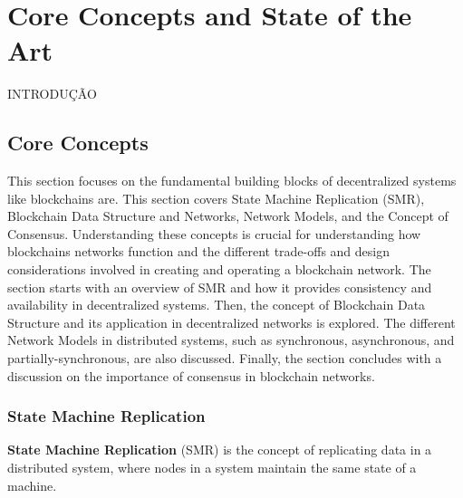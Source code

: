 \chapter{Core Concepts and State of the Art}
INTRODUÇÃO
\section{Core Concepts}
This section focuses on the fundamental building blocks of decentralized systems like blockchains are. This section covers State Machine Replication (SMR), Blockchain Data Structure and Networks, Network Models, and the Concept of Consensus. Understanding these concepts is crucial for understanding how blockchains networks function and the different trade-offs and design considerations involved in creating and operating a blockchain network. The section starts with an overview of SMR and how it provides consistency and availability in decentralized systems. Then, the concept of Blockchain Data Structure and its application in decentralized networks is explored. The different Network Models in distributed systems, such as synchronous, asynchronous, and partially-synchronous, are also discussed. Finally, the section concludes with a discussion on the importance of consensus in blockchain networks.


\subsection*{\textbf{State Machine Replication}}
\textbf{State Machine Replication} (SMR) is the concept of replicating data in a distributed system, where nodes in a system maintain the same state of a machine.

